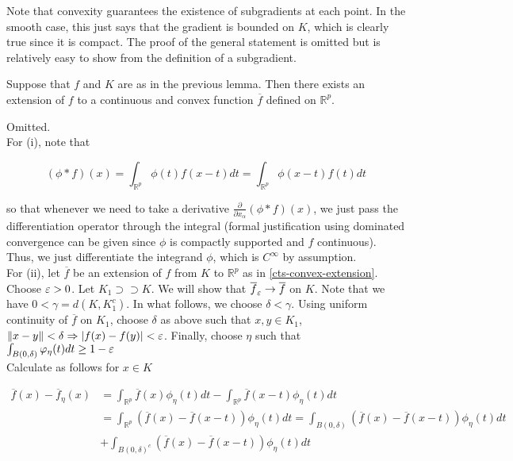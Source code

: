 \documentclass[11pt,reqno]{amsart}
\numberwithin{equation}{section}
\newcommand{\mr}{\mathbb{R}}
\newcommand{\ov}{\overline}
\newcommand{\pa}{\partial}
\begin{document}
\proof Note that convexity guarantees the existence of subgradients at each point. In the smooth case, this just says that the gradient is bounded on $K$, which is clearly true since it is compact. The proof of the general statement is omitted but is relatively easy to show from the definition of a subgradient. \\

\begin{lemma} \label{cts-convex-extension}
Suppose that $f$ and $K$ are as in the previous lemma. Then there exists an extension of $f$ to a continuous and convex function $\ov{f}$ defined on $\mr^p$. 
\end{lemma}

\proof Omitted. \\

For (i), note that 

\begin{equation} \label{conv-def}
(\phi \ast f)(x) = \int_{\mr^p} \phi(t) f(x - t) dt = \int_{\mr^p} \phi(x - t) f(t) dt 
\end{equation}

so that whenever we need to take a derivative $\frac{\pa}{\pa x_{\alpha}} (\phi \ast f)(x)$, we just pass the differentiation operator through the integral (formal justification using dominated convergence can be given since $\phi$ is compactly supported and $f$ continuous). Thus, we just differentiate the integrand $\phi$, which is $C^{\infty}$ by assumption. \\

For (ii), let $\ov{f}$ be an extension of $f$ from $K$ to $\mr^p$ as in \eqref{cts-convex-extension}. Choose $\varepsilon > 0$. Let $K_1 \supset \supset K$. We will show that $\ov{f}_{\eps} \to \ov{f}$ on $K$. Note that we have $0 < \gamma = d(K, K_1^c)$. In what follows, we choose $\delta < \gamma$. Using uniform continuity of $\ov{f}$ on $K_1$, choose $\delta$ as above such that $x,y \in K_1$, $\|x - y\| <\delta \Rightarrow |f(x) - f(y)| < \varepsilon$. Finally, choose $\eta$ such that $\int_{B(0, \delta)} \varphi_{\eta}(t) dt \geq 1 - \varepsilon$ \\

Calculate as follows for $x \in K$

\begin{equation} \label{conv1}
\begin{aligned}
\ov{f}(x) - \ov{f}_{\eta}(x) &= \int_{\mr^p} \ov{f}(x) \phi_{\eta}(t) dt - \int_{\mr^p} \ov{f}(x - t) \phi_{\eta}(t) dt\\
&= \int_{\mr^p} (\ov{f}(x) - \ov{f}(x -t)) \phi_{\eta}(t) dt = \int_{B(0,\delta)} (\ov{f}(x) - \ov{f}(x -t)) \phi_{\eta}(t) dt  \\
&+ \int_{B(0, \delta)^c } (\ov{f}(x) - \ov{f}(x -t)) \phi_{\eta}(t) dt 
\end{aligned}
\end{equation}
\end{document}
